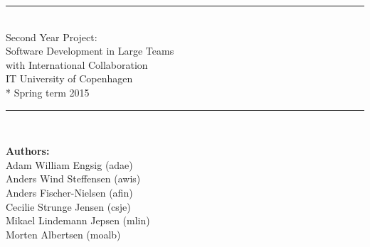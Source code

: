 \begin{titlepage}

\begin{center}


\vspace{67mm}

\rule{\textwidth}{1mm}\\
\vspace*{17mm}
\huge{
Second Year Project: \\ 
Software Development in Large Teams \\
with International Collaboration \\ 
\vspace*{8mm}
IT University of Copenhagen \\*
Spring term 2015
}
\vspace*{7mm}

\rule{\textwidth}{1mm}\\

\vspace*{19mm}


\begin{Large}
\textbf{Authors:} \\
\vspace*{2mm}
Adam William Engsig  (adae)\\
Anders Wind Steffensen (awis) \\
Anders Fischer-Nielsen (afin) \\
Cecilie Strunge Jensen (csje) \\
Mikael Lindemann Jepsen (mlin) \\
Morten Albertsen (moalb)\\
\end{Large}
\end{center}
\end{titlepage}
\newpage